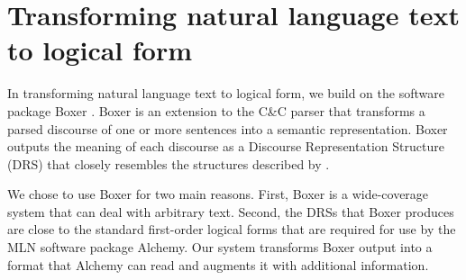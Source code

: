 \section{Transforming natural language text to logical form}

In transforming natural language text to logical form, we build on the software
package Boxer \citep{bos:coling2004}. Boxer
is an extension to the C\&C parser \citep{clark:acl04} that transforms a parsed
discourse of one or more sentences into a semantic representation.  Boxer
outputs the meaning of each discourse as a Discourse Representation Structure
(DRS) that closely resembles the structures described by \citet{kamp:book93}.

We chose to use Boxer for two main reasons.  First, Boxer is a
wide-coverage system that can deal with arbitrary text. 
Second, the DRSs that Boxer produces are close to the standard first-order
logical forms that are required for use by the MLN software package 
Alchemy.  Our system transforms Boxer output into a format that Alchemy can read and 
augments it with additional information.
